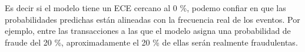 \documentclass{article}
\begin{document}
\begin{appendix}
    Es decir si el modelo tiene un ECE cercano al 0 \%, podemo confiar en que las probabilidades predichas están alineadas con la frecuencia real de los eventos. Por ejemplo, entre las transacciones a las que el modelo asigna una probabilidad de fraude del 20 \%, aproximadamente el 20 \% de ellas serán realmente fraudulentas.
\end{appendix}
\end{document}
